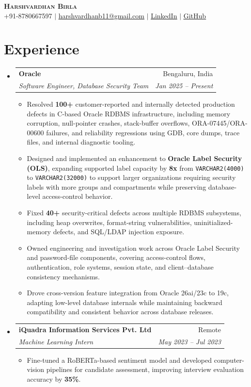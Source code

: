 \documentclass[letterpaper,10pt]{article}
\makeatletter
\newcommand{\resumeItem}[1]{\item\small{{#1\vspace{-2pt}}}}
\newcommand{\resumeSubheading}[4]{\vspace{-2pt}\item\begin{tabular*}{0.97\textwidth}[t]{l@{\extracolsep{\fill}}r}\textbf{#1} & #2 \\\textit{\footnotesize#3} & \textit{\footnotesize#4} \\\end{tabular*}\vspace{-7pt}}
\newcommand{\resumeSubHeadingListStart}{\begin{itemize}[leftmargin=0.12in,label={}]}
\newcommand{\resumeSubHeadingListEnd}{\end{itemize}}
\newcommand{\resumeItemListStart}{\begin{itemize}[leftmargin=0.18in]}
\newcommand{\resumeItemListEnd}{\end{itemize}\vspace{-8pt}}
\makeatother
\begin{document}
\begin{center}
\textbf{\Huge\scshape Harshvardhan Birla}\\\vspace{2pt}
\small +91-8780667597 $|$ \href{mailto:harshvardhanb11@gmail.com}{\underline{harshvardhanb11@gmail.com}} $|$ \href{https://www.linkedin.com/in/harshvardhan-birla-160a31230}{\underline{LinkedIn}} $|$ \href{https://github.com/harshvardhanb11}{\underline{GitHub}}
\end{center}
\vspace{-5pt}
\section{Experience}
\resumeSubHeadingListStart
\resumeSubheading{Oracle}{Bengaluru, India}{Software Engineer, Database Security Team}{Jan 2025 -- Present}
\resumeItemListStart
\resumeItem{Resolved \textbf{100+} customer-reported and internally detected production defects in C-based Oracle RDBMS infrastructure, including memory corruption, null-pointer crashes, stack-buffer overflows, ORA-07445/ORA-00600 failures, and reliability regressions using GDB, core dumps, trace files, and internal diagnostic tooling.}
\resumeItem{Designed and implemented an enhancement to \textbf{Oracle Label Security (OLS)}, expanding supported label capacity by \textbf{8x} from \texttt{VARCHAR2(4000)} to \texttt{VARCHAR2(32000)} to support larger organizations requiring security labels with more groups and compartments while preserving database-level access-control behavior.}
\resumeItem{Fixed \textbf{40+} security-critical defects across multiple RDBMS subsystems, including heap overwrites, format-string vulnerabilities, uninitialized-memory defects, and SQL/LDAP injection exposure.}
\resumeItem{Owned engineering and investigation work across Oracle Label Security and password-file components, covering access-control flows, authentication, role systems, session state, and client--database consistency mechanisms.}
\resumeItem{Drove cross-version feature integration from Oracle 26ai/23c to 19c, adapting low-level database internals while maintaining backward compatibility and consistent behavior across database releases.}
\resumeItemListEnd
\resumeSubheading{iQuadra Information Services Pvt. Ltd}{Remote}{Machine Learning Intern}{May 2023 -- Jul 2023}
\resumeItemListStart
\resumeItem{Fine-tuned a RoBERTa-based sentiment model and developed computer-vision pipelines for candidate assessment, improving interview evaluation accuracy by \textbf{35\%}.}
\resumeItemListEnd
\resumeSubHeadingListEnd
\end{document}
